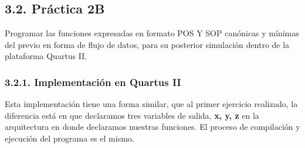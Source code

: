 \documentclass[letterpaper]{article} %
\begin{document}
        \subsection*{3.2. Pr\'actica 2B}
        Programar las funciones expresadas en formato POS Y SOP can\'onicas y m\'inimas del previo
        en forma de flujo de datos, para su posterior simulación dentro de la plataforma Quartus II.

        \subsubsection*{3.2.1. Implementaci\'on en Quartus II}

            \begin{figure}[H]
                \raggedright
            \end{figure}

            Esta implementaci\'on tiene una forma similar, que al primer ejercicio realizado, la diferencia est\'a 
            en que declaramos tres variables de salida, \textbf{x, y, z} en la arquitectura en donde declaramos nuestras funciones.
            El proceso de compilaci\'on y ejecuci\'on del programa es el mismo. 

            \begin{figure}[H]
                \raggedright
            \end{figure}
\end{document}

